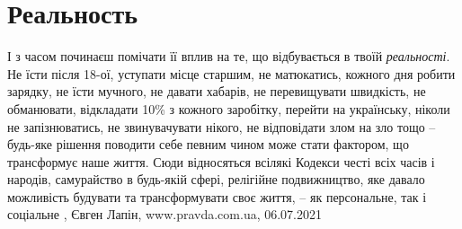  
 
 
 
 
\chapter{Реальность}

І з часом починаєш помічати її вплив на те, що відбувається в твоїй
\emph{реальності}.  Не їсти після 18-ої, уступати місце старшим, не матюкатись,
кожного дня робити зарядку, не їсти мучного, не давати хабарів, не перевищувати
швидкість, не обманювати, відкладати 10\% з кожного заробітку, перейти на
українську, ніколи не запізнюватись, не звинувачувати нікого, не відповідати
злом на зло тощо – будь-яке рішення поводити себе певним чином може стати
фактором, що трансформує наше життя.  Сюди відносяться всілякі Кодекси честі
всіх часів і народів, самурайство в будь-якій сфері, релігійне подвижництво,
яке давало можливість будувати та трансформувати своє життя, – як персональне,
так і соціальне
, 
Євген Лапін, www.pravda.com.ua, 06.07.2021
